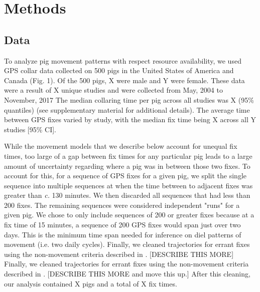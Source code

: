 \documentclass[a4paper]{article}
\begin{document}

\section*{Methods}

\subsection*{Data}

To analyze pig movement patterns with respect resource availability, we used GPS collar data collected on 500 pigs in the United States of America and Canada (Fig. 1).  Of the 500 pigs, X were male and Y were female. These data were a result of X unique studies and were collected from May, 2004 to November, 2017  The median collaring time per pig across all studies was X (95\% quantiles) (see supplementary material for additional details). The average time between GPS fixes varied by study, with the median fix time being X across all Y studies [95\% CI]. 

While the movement models that we describe below account for unequal fix times, too large of a gap between fix times for any particular pig leads to a large amount of uncertainty regarding where a pig was in between those two fixes. To account for this, for a sequence of GPS fixes for a given pig, we split the single sequence into multiple sequences at when the time between to adjacent fixes was greater than \emph{c.} 130 minutes. We then discarded all sequences that had less than 200 fixes. The remaining sequences were considered independent "runs" for a given pig. We chose to only include sequences of 200 or greater fixes because at a fix time of 15 minutes, a sequence of 200 GPS fixes would span just over two days. This is the minimum time span needed for inference on diel patterns of movement (i.e. two daily cycles).  Finally, we cleaned trajectories for errant fixes using the non-movement criteria described in \cite{Bjorneraas2010}. [DESCRIBE THIS MORE]  Finally, we cleaned trajectories for errant fixes using the non-movement criteria described in \cite{Bjorneraas2010}. [DESCRIBE THIS MORE and move this up.] After this cleaning, our analysis contained X pigs and a total of X fix times.
\end{document}
